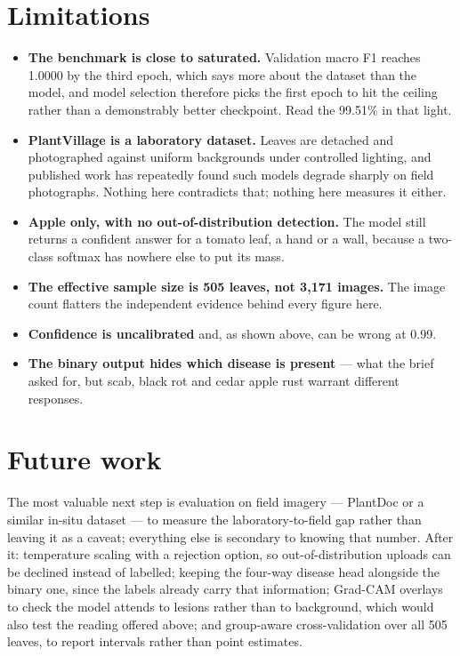 \documentclass[10pt,a4paper]{article}
\begin{document}
\section{Limitations}

\begin{itemize}
\item \textbf{The benchmark is close to saturated.} Validation macro F1 reaches 1.0000
by the third epoch, which says more about the dataset than the model, and model
selection therefore picks the first epoch to hit the ceiling rather than a demonstrably
better checkpoint. Read the 99.51\% in that light.
\item \textbf{PlantVillage is a laboratory dataset.} Leaves are detached and
photographed against uniform backgrounds under controlled lighting, and published work
has repeatedly found such models degrade sharply on field photographs. Nothing here
contradicts that; nothing here measures it either.
\item \textbf{Apple only, with no out-of-distribution detection.} The model still
returns a confident answer for a tomato leaf, a hand or a wall, because a two-class
softmax has nowhere else to put its mass.
\item \textbf{The effective sample size is 505 leaves, not 3{,}171 images.} The image
count flatters the independent evidence behind every figure here.
\item \textbf{Confidence is uncalibrated} and, as shown above, can be wrong at 0.99.
\item \textbf{The binary output hides which disease is present} --- what the brief asked
for, but scab, black rot and cedar apple rust warrant different responses.
\end{itemize}

\section{Future work}

The most valuable next step is evaluation on field imagery --- PlantDoc or a similar
in-situ dataset --- to measure the laboratory-to-field gap rather than leaving it as a
caveat; everything else is secondary to knowing that number. After it: temperature
scaling with a rejection option, so out-of-distribution uploads can be declined instead
of labelled; keeping the four-way disease head alongside the binary one, since the
labels already carry that information; Grad-CAM overlays to check the model attends to
lesions rather than to background, which would also test the reading offered above; and
group-aware cross-validation over all 505 leaves, to report intervals rather than point
estimates.
\end{document}
